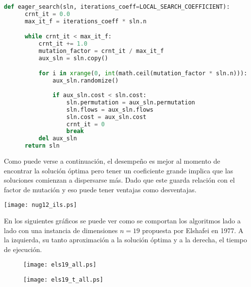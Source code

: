 \newpage

\begin{lstlisting}[language=Python]
  def eager_search(sln, iterations_coeff=LOCAL_SEARCH_COEFFICIENT):
      crnt_it = 0.0
      max_it_f = iterations_coeff * sln.n

      while crnt_it < max_it_f:
          crnt_it += 1.0
          mutation_factor = crnt_it / max_it_f
          aux_sln = sln.copy()

          for i in xrange(0, int(math.ceil(mutation_factor * sln.n))):
              aux_sln.randomize()
              
              if aux_sln.cost < sln.cost:
                  sln.permutation = aux_sln.permutation
                  sln.flows = aux_sln.flows
                  sln.cost = aux_sln.cost
                  crnt_it = 0
                  break
          del aux_sln
      return sln
\end{lstlisting}

Como puede verse a continuación, el desempeño es mejor al momento de encontrar la solución óptima pero tener un coeficiente grande implica que las soluciones comienzan a dispersarse más. Dado que este guarda relación con el factor de mutación y eso puede tener ventajas como desventajas.

\begin{center}
    \texttt{[image: nug12\_ils.ps]}
\end{center}

\newpage

En los siguientes gráficos se puede ver como se comportan los algoritmos lado a lado con una instancia de dimensiones $n=19$ propuesta por Elshafei en 1977\cite{els19}. A la izquierda, su tanto aproximación a la solución óptima y a la derecha, el tiempo de ejecución.

\begin{figure}[h]
    \centering
    \begin{minipage}{0.5\textwidth}
        \centering
        \texttt{[image: els19\_all.ps]} %
    \end{minipage}\hfill
    \begin{minipage}{0.5\textwidth}
        \centering
        \texttt{[image: els19\_t\_all.ps]} %
    \end{minipage}
\end{figure}

